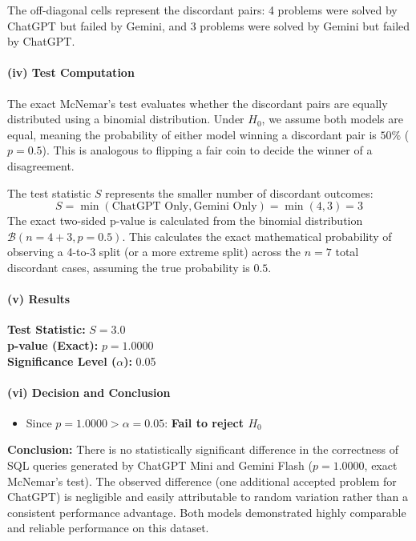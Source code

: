 \documentclass[11pt,a4paper]{article}
\begin{document}
    The off-diagonal cells represent the discordant pairs: 4 problems were solved by ChatGPT but failed by Gemini, and 3 problems were solved by Gemini but failed by ChatGPT. 

    \paragraph{(iv) Test Computation}
    \quad

    The exact McNemar's test evaluates whether the discordant pairs are equally distributed using a binomial distribution. Under $H_0$, we assume both models are equal, meaning the probability of either model winning a discordant pair is $50\%$ ($p = 0.5$). This is analogous to flipping a fair coin to decide the winner of a disagreement.

    The test statistic $S$ represents the smaller number of discordant outcomes:
    \[
    S = \min(\text{ChatGPT Only}, \text{Gemini Only}) = \min(4, 3) = 3
    \]
    The exact two-sided p-value is calculated from the binomial distribution $\mathcal{B}(n = 4 + 3, p = 0.5)$. This calculates the exact mathematical probability of observing a 4-to-3 split (or a more extreme split) across the $n=7$ total discordant cases, assuming the true probability is $0.5$.

    \paragraph{(v) Results}
    \quad

    \textbf{Test Statistic:} $S = 3.0$ \\
    \textbf{p-value (Exact):} $p = 1.0000$ \\
    \textbf{Significance Level ($\alpha$):} 0.05 

    \paragraph{(vi) Decision and Conclusion}
    \quad

    \begin{itemize}
        \item Since $p = 1.0000 > \alpha = 0.05$: \textbf{Fail to reject $H_0$}
    \end{itemize}

    \textbf{Conclusion:} There is no statistically significant difference in the correctness of SQL queries generated by ChatGPT Mini and Gemini Flash ($p = 1.0000$, exact McNemar's test). The observed difference (one additional accepted problem for ChatGPT) is negligible and easily attributable to random variation rather than a consistent performance advantage. Both models demonstrated highly comparable and reliable performance on this dataset.
\end{document}
